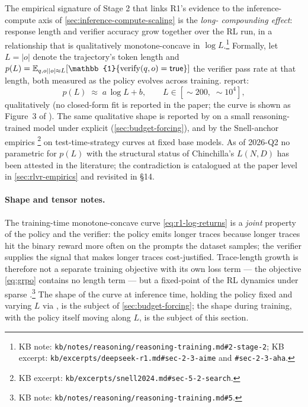 The empirical signature of Stage 2 that links R1's evidence to the
inference-compute axis of \cref{sec:inference-compute-scaling} is the
\emph{long- compounding effect}: response length and verifier
accuracy grow together over the RL run, in a relationship that is
qualitatively monotone-concave in
$\log\!L$.\footnote{KB note:
\texttt{kb/notes/reasoning/reasoning-training.md\#2-stage-2}; KB
excerpt: \texttt{kb/excerpts/deepseek-r1.md\#sec-2-3-aime} and
\texttt{\#sec-2-3-aha}.} Formally, let $L = |o|$ denote the
trajectory's token length and $p(L) = \E_{q, o \mid |o| \approx L}
[\mathbb{1}\{\mathrm{verify}(q, o) = \mathsf{true}\}]$ the verifier
pass rate at that length, both measured as the policy evolves
across training. \citet[\S 2.3]{deepseek-r1} report:
\begin{equation}
  p(L) \;\approx\; a\,\log L + b,
  \qquad L \in [\sim\!200,\;\sim\!10^4],
  \label{eq:r1-log-returns}
\end{equation}
qualitatively (no closed-form fit is reported in the paper; the
curve is shown as Figure~3 of \citet{deepseek-r1}). The same
qualitative shape is reported by \citet{s1-2025} on a small
reasoning-trained model under explicit 
(\cref{sec:budget-forcing}), and by the Snell-anchor empirics
\citep[\S 5--6]{snell2024}\footnote{KB excerpt:
\texttt{kb/excerpts/snell2024.md\#sec-5-2-search}.} on
test-time-strategy curves at fixed base models. As of 2026-Q2 no
parametric  for $p(L)$ with the structural status of
Chinchilla's $L(N, D)$ has been attested in the literature; the
contradiction is catalogued at the paper level in
\cref{sec:rlvr-empirics} and revisited in §14.

\paragraph{Shape and tensor notes.} The training-time monotone-concave
curve \cref{eq:r1-log-returns} is a \emph{joint} property of the
policy and the verifier: the policy emits longer traces because longer
traces hit the binary reward more often on the prompts the dataset
samples; the verifier supplies the signal that makes longer traces
cost-justified. Trace-length growth is therefore not a separate
training objective with its own loss term --- the  objective
\cref{eq:grpo} contains no length term --- but a fixed-point of the
RL dynamics under sparse 
\citep[\S 2.2.2]{deepseek-r1}.\footnote{KB note:
\texttt{kb/notes/reasoning/reasoning-training.md\#5}.} The shape of
the curve at inference time, holding the policy fixed and varying
$L$ via , is the subject of \cref{sec:budget-forcing};
the shape during training, with the policy itself moving along $L$,
is the subject of this section.

